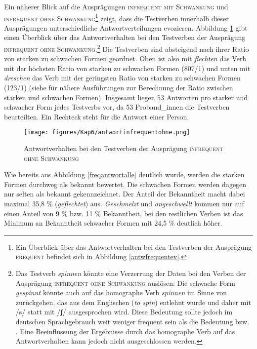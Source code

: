 Ein näherer Blick auf die Ausprägungen \textsc{infrequent mit Schwankung} und \textsc{infrequent ohne Schwankung}\footnote{Ein Überblick über das Antwortverhalten bei den Testverben der Ausprägung \textsc{frequent} befindet sich in Abbildung \ref{antwfrequentev}.} zeigt, dass die Testverben innerhalb dieser Ausprägungen unterschiedliche Antwortverteilungen evozieren. Abbildung \ref{freqantwortohne} gibt einen Überblick über das Antwortverhalten bei den Testverben der Ausprägung \textsc{infrequent ohne Schwankung}.\footnote{Das Testverb \textit{spinnen} könnte eine Verzerrung der Daten bei den Verben der Ausprägung \textsc{infrequent ohne Schwankung} auslösen: Die schwache Form \textit{gespinnt} könnte auch auf das homographe Verb \textit{spinnen} im Sinne von  zurückgehen, das aus dem Englischen (\textit{to spin}) entlehnt wurde und daher mit /s/ statt mit /ʃ/ ausgesprochen wird. Diese Bedeutung sollte jedoch im deutschen Sprachgebrauch weit weniger frequent sein als die Bedeutung  bzw. . Eine Beeinflussung der Ergebnisse durch das homographe Verb auf das Antwortverhalten kann jedoch nicht ausgeschlossen werden.} Die Testverben sind absteigend nach ihrer Ratio von starken zu schwachen Formen geordnet. Oben ist also mit \textit{flechten} das Verb mit der höchsten Ratio von starken zu schwachen Formen (807/1) und unten mit \textit{dreschen} das Verb mit der geringsten Ratio von starken zu schwachen Formen (123/1) (siehe  für nähere Ausführungen zur Berechnung der Ratio zwischen starken und schwachen Formen). Insgesamt liegen 53 Antworten pro starker und schwacher Form jedes Testverbs vor, da 53 Proband\_innen die Testverben beurteilten. Ein Rechteck steht für die Antwort einer Person.

\begin{figure}
\texttt{[image: figures/Kap6/antwortinfrequentohne.png]} 
\caption{Antwortverhalten bei den Testverben der Ausprägung \textsc{infrequent ohne Schwankung}}
\label{freqantwortohne}
\end{figure}

Wie bereits aus Abbildung \ref{freqantwortalle} deutlich wurde, werden die starken Formen durchweg als bekannt bewertet. Die schwachen Formen werden dagegen nur selten als bekannt gekennzeichnet. Der Anteil der Bekanntheit macht dabei maximal 35,8 \% (\textit{geflechtet}) aus. \textit{Geschmelzt} und \textit{angeschwellt} kommen nur auf einen Anteil von 9 \% bzw. 11 \% Bekanntheit, bei den restlichen Verben ist das Minimum an Bekanntheit schwacher Formen mit 24,5 \% deutlich höher. 

